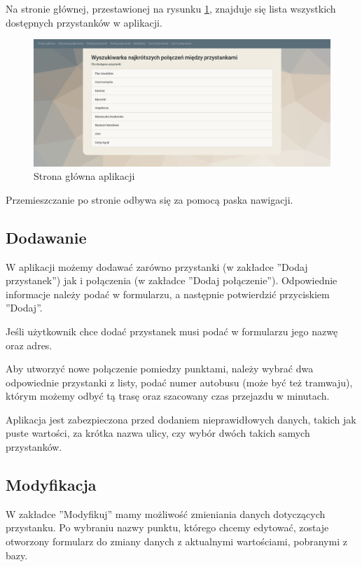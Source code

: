 \documentclass[12pt]{article}
\begin{document}
Na stronie głównej, przestawionej na rysunku \ref{fig:rys1}, znajduje się lista wszystkich dostępnych przystanków w aplikacji.

\begin{figure}[h]
\begin{center}
\includegraphics[width=14cm]{strona.png} 
\caption{Strona główna aplikacji} \label{fig:rys1}
\end{center}
\end{figure}

Przemieszczanie po stronie odbywa się za pomocą paska nawigacji.

\subsection{Dodawanie}
W aplikacji możemy dodawać zarówno przystanki (w zakładce ''Dodaj przystanek'') jak i połączenia (w zakładce ''Dodaj połączenie''). Odpowiednie informacje należy podać w formularzu, a następnie potwierdzić przyciskiem ''Dodaj''.

Jeśli użytkownik chce dodać przystanek musi podać w formularzu jego nazwę oraz adres. 

Aby utworzyć nowe połączenie pomiedzy punktami, należy wybrać dwa odpowiednie przystanki z listy, podać numer autobusu (może być też tramwaju), którym możemy odbyć tą trasę oraz szacowany czas przejazdu w minutach.

Aplikacja jest zabezpieczona przed dodaniem nieprawidłowych danych, takich jak puste wartości, za krótka nazwa ulicy, czy wybór dwóch takich samych przystanków.

\subsection{Modyfikacja}
W zakładce ''Modyfikuj'' mamy możliwość zmieniania danych dotyczących przystanku. Po wybraniu nazwy punktu, którego chcemy edytować, zostaje otworzony formularz do zmiany danych z aktualnymi wartościami, pobranymi z bazy.
\end{document}
